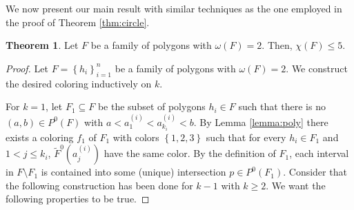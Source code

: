 \documentclass[12pt]{article}
\theoremstyle{definition}
\newtheorem{thm}{Theorem}
\newcommand{\defeq}{\vcentcolon=}
\begin{document}
     We now present our main result
     with similar techniques as the one
     employed in the proof of
     Theorem \ref{thm:circle}.

     \begin{thm}
         Let $F$ be a family of
         polygons with $\omega\left(F\right) = 2$.
         Then, $\chi\left(F\right) \leq 5$.
     \end{thm}
     \begin{proof}
         Let $F = \left\{h_{i}\right\}_{i = 1}^{n}$
         be a family of polygons with
         $\omega\left(F\right) = 2$.
         We construct the desired
         coloring inductively on $k$.

         For $k = 1$, let $F_1 \subseteq F$
         be the subset of polygons
         $h_{i} \in F$ such that 
         there is no $\left(a, b\right)
         \in P^{0}\left(F\right)$
         with $a < a_1^{\left(i\right)} <
         a_{k_{i}}^{\left(i\right)} < b$.
         By Lemma \ref{lemma:poly} there
         exists a coloring $f_1$ of $F_1$
         with colors $\left\{1, 2, 3\right\}$ 
         such that for every $h_{i} \in F_1$ 
         and $1 < j \leq k_{i}$,
         $\widetilde{F}^{0}\left(a_{j}^{\left(i\right)}\right)$ 
         have the same color.
         By the definition of $F_1$,
         each interval in $F \setminus F_1$ 
         is contained into some (unique)
         intersection $p \in P^{0}\left(F_1\right)$.
         Consider that the following construction 
         has been done for $k - 1$
         with $k \geq 2$. We want the 
         following properties to be true.
\end{proof}
\end{document}

